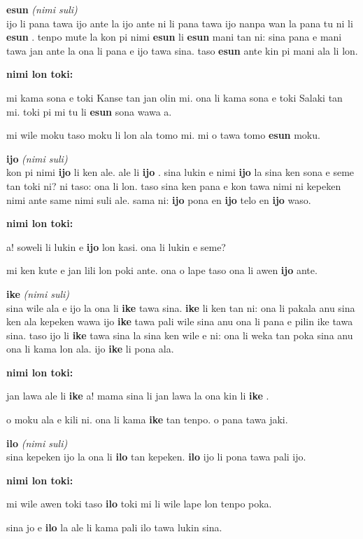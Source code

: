 \documentclass[a4paper,11pt]{book}
\newenvironment{definition}[2]{ %
  \begin{description}
  \item
    {\huge \textbf{#1}}
    {\Large \textit{(#2)}} \\
}{
  \end{description}%
}
\newenvironment{example}{ %
  \item
  \textbf{nimi lon toki:}
  
  \hfill
  \begin{minipage}{\dimexpr\textwidth-1cm}
  \begin{itshape}
}
{
  \end{itshape}
  \end{minipage}
}
\newcommand{\inex}[1]{%
  \textbf{#1}%
}
\begin{document}
\begin{definition}{esun}{nimi suli}
  ijo li pana tawa ijo ante la ijo ante ni li pana tawa ijo nanpa wan la pana tu ni li \inex{esun}. tenpo mute la kon pi nimi \inex{esun} li \inex{esun} mani tan ni: sina pana e mani tawa jan ante la ona li pana e ijo tawa sina. taso \inex{esun} ante kin pi mani ala li lon.
  \begin{example}
    mi kama sona e toki Kanse tan jan olin mi. ona li kama sona e toki Salaki tan mi. toki pi mi tu li \inex{esun} sona wawa a.
    
    mi wile moku taso moku li lon ala tomo mi. mi o tawa tomo \inex{esun} moku.
  \end{example}
\end{definition}

\begin{definition}{ijo}{nimi suli}
  kon pi nimi \inex{ijo} li ken ale. ale li \inex{ijo}. sina lukin e nimi \inex{ijo} la sina ken sona e seme tan toki ni? ni taso: ona li lon. taso sina ken pana e kon tawa nimi ni kepeken nimi ante same nimi suli ale. sama ni: \inex{ijo} pona en \inex{ijo} telo en \inex{ijo} waso.
  \begin{example}
    a! soweli li lukin e \inex{ijo} lon kasi. ona li lukin e seme?
    
    mi ken kute e jan lili lon poki ante. ona o lape taso ona li awen \inex{ijo} ante.
  \end{example}
\end{definition}

\begin{definition}{ike}{nimi suli}
  sina wile ala e ijo la ona li \inex{ike} tawa sina. \inex{ike} li ken tan ni: ona li pakala anu sina ken ala kepeken wawa ijo \inex{ike} tawa pali wile sina anu ona li pana e pilin ike tawa sina. taso ijo li \inex{ike} tawa sina la sina ken wile e ni: ona li weka tan poka sina anu ona li kama lon ala. ijo \inex{ike} li pona ala.
  \begin{example}
    jan lawa ale li \inex{ike} a! mama sina li jan lawa la ona kin li \inex{ike}.
    
    o moku ala e kili ni. ona li kama \inex{ike} tan tenpo. o pana tawa jaki.
  \end{example}
\end{definition}

\begin{definition}{ilo}{nimi suli}
  sina kepeken ijo la ona li \inex{ilo} tan kepeken. \inex{ilo} ijo li pona tawa pali ijo.
  \begin{example}
    mi wile awen toki taso \inex{ilo} toki mi li wile lape lon tenpo poka.
    
    sina jo e \inex{ilo} la ale li kama pali ilo tawa lukin sina.
  \end{example}
\end{definition}
\end{document}
